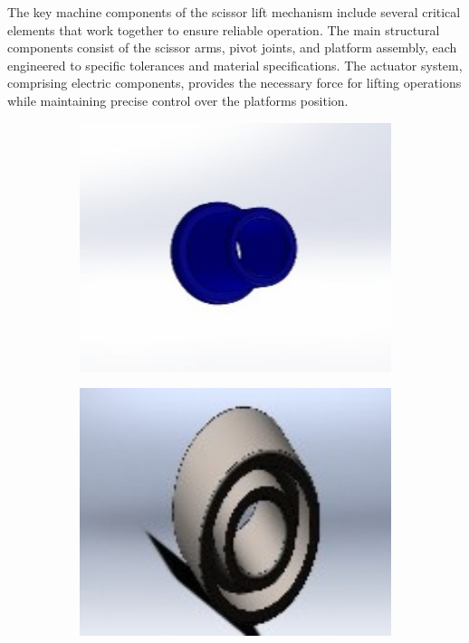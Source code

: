 \documentclass[../../main]{subfiles}
\begin{document}
The key machine components of the scissor lift mechanism include several
critical elements that work together to ensure reliable operation. The
main structural components consist of the scissor arms, pivot joints,
and platform assembly, each engineered to specific tolerances and
material specifications. The actuator system, comprising electric
components, provides the necessary force for lifting operations while
maintaining precise control over the platform\textquotesingle s
position.
\begin{figure}[h]
\centering

\begin{subfigure}[b]{0.30\textwidth}
  \centering
  \includegraphics[width=1\textwidth]{img/image093.jpg}
  \caption[short]{}
  \label{a}
\end{subfigure}
\hfill
\begin{subfigure}[b]{0.30\textwidth}
  \centering
  \includegraphics[width=1\textwidth]{img/image095.jpg}

\end{subfigure}
\end{figure}
\end{document}
